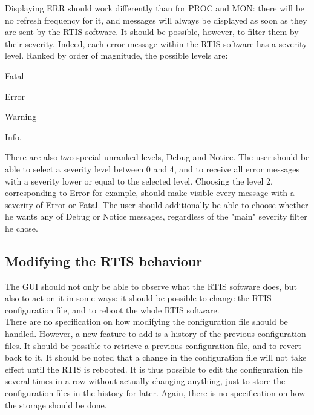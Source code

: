 \documentclass{themeensg}
\begin{document}
Displaying ERR should work differently than for PROC and MON: there will be no refresh frequency for it, and messages will always be displayed as soon as they are sent by the RTIS software. It should be possible, however, to filter them by their severity. Indeed, each error message within the RTIS software has a severity level. Ranked by order of magnitude, the possible levels are: \begin{enumerate*}
  \item Fatal
  \item Error
  \item Warning
  \item Info.
\end{enumerate*}
There are also two special unranked levels, Debug and Notice. The user should be able to select a severity level between 0 and 4, and to receive all error messages with a severity lower or equal to the selected level. Choosing the level 2, corresponding to Error for example, should make visible every message with a severity of Error or Fatal. The user should additionally be able to choose whether he wants any of Debug or Notice messages, regardless of the "main" severity filter he chose.

\subsection{Modifying the RTIS behaviour}

The GUI should not only be able to observe what the RTIS software does, but also to act on it in some ways: it should be possible to change the RTIS configuration file, and to reboot the whole RTIS software.\\

There are no specification on how modifying the configuration file should be handled. However, a new feature to add is a history of the previous configuration files. It should be possible to retrieve a previous configuration file, and to revert back to it. It should be noted that a change in the configuration file will not take effect until the RTIS is rebooted. It is thus possible to edit the configuration file several times in a row without actually changing anything, just to store the configuration files in the history for later. Again, there is no specification on how the storage should be done.
\end{document}

